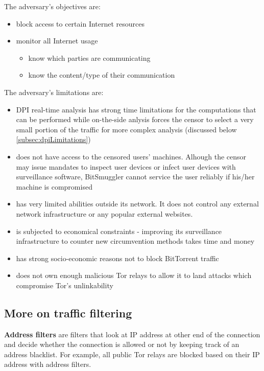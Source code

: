 \documentclass[11pt]{article} %
\newcommand{\projectName}{BitSmuggler }
\begin{document}
The adversary's objectives are:
\begin{itemize}
\item block access to certain Internet resources
\item monitor all Internet usage
\begin{itemize}
\item know which parties are communicating
\item know the content/type of their communication
\end{itemize}
\end{itemize}

The adversary's limitations are:

\begin{itemize}
\item DPI real-time analysis has strong time limitations for the computations that can be performed while on-the-side anlysis forces the censor to select a very small portion of the traffic for more complex analysis (discussed below  \ref{subsec:dpiLimitations}) 
\item does not have access to the censored users' machines. Alhough the censor may issue mandates to inspect user devices or infect user devices with surveillance software, \projectName cannot service the user reliably if his/her machine is compromised
\item has very limited abilities outside its network. It does not control any external network infrastructure or any popular external websites.
\item is subjected to economical constraints - improving its surveillance infrastructure to counter new circumvention methods takes time and money
\item has strong socio-economic reasons not to block BitTorrent traffic
\item does not own enough malicious Tor relays to allow it to land attacks which compromise Tor's unlinkability
\end{itemize}

\subsection{More on traffic filtering}
\label{subsec:trafficFiltering}

\textbf{Address filters} are filters that look at IP address at other end of the connection and decide whether the connection is allowed or not by keeping track of an address blacklist. For example, all public Tor relays are blocked based on their IP address with address filters.
\end{document}
